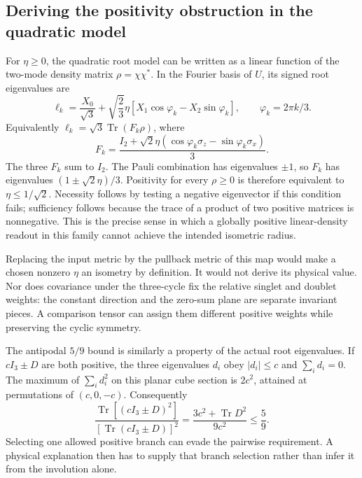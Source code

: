 \documentclass[11pt,a4paper]{article}
\begin{document}
\subsection{Deriving the positivity obstruction in the quadratic model}
For $\eta\geq0$, the quadratic root model can be written as a linear function of the
two-mode density matrix $\rho=\chi\chi^*$. In the Fourier basis of
$U$, its signed root eigenvalues are
\begin{equation}
 \ell_k=\frac{X_0}{\sqrt3}
 +\sqrt{\frac23}\eta[X_1\cos\varphi_k-X_2\sin\varphi_k],
 \qquad \varphi_k=2\pi k/3.
\end{equation}
Equivalently $\ell_k=\sqrt3\operatorname{Tr}(F_k\rho)$, where
\begin{equation}
 F_k=\frac{I_2+\sqrt2\eta(\cos\varphi_k\sigma_z-
                               \sin\varphi_k\sigma_x)}{3}.
\end{equation}
The three $F_k$ sum to $I_2$. The Pauli combination has eigenvalues
$\pm1$, so $F_k$ has eigenvalues $(1\pm\sqrt2\eta)/3$.
Positivity for every $\rho\geq0$ is therefore equivalent to
$\eta\leq1/\sqrt2$. Necessity follows by testing a negative
eigenvector if this condition fails; sufficiency follows because
the trace of a product of two positive matrices is nonnegative.
This is the precise sense in which a globally positive linear-density
readout in this family cannot achieve the intended isometric radius.

Replacing the input metric by the pullback metric of this map would
make a chosen nonzero $\eta$ an isometry by definition. It would
not derive its physical value. Nor does covariance under the three-cycle
fix the relative singlet and doublet weights: the constant direction
and the zero-sum plane are separate invariant pieces. A comparison
tensor can assign them different positive weights while preserving
the cyclic symmetry.

The antipodal $5/9$ bound is similarly a property of the actual
root eigenvalues. If $cI_3\pm D$ are both positive, the three
eigenvalues $d_i$ obey $|d_i|\leq c$ and $\sum_i d_i=0$.
The maximum of $\sum_i d_i^2$ on this planar cube section is
$2c^2$, attained at permutations of $(c,0,-c)$. Consequently
\begin{equation}
 \frac{\operatorname{Tr}[(cI_3\pm D)^2]}
      {[\operatorname{Tr}(cI_3\pm D)]^2}
 =\frac{3c^2+\operatorname{Tr}D^2}{9c^2}\leq\frac59.
\end{equation}
Selecting one allowed positive branch can evade the pairwise
requirement. A physical explanation then has to supply that branch
selection rather than infer it from the involution alone.
\end{document}
